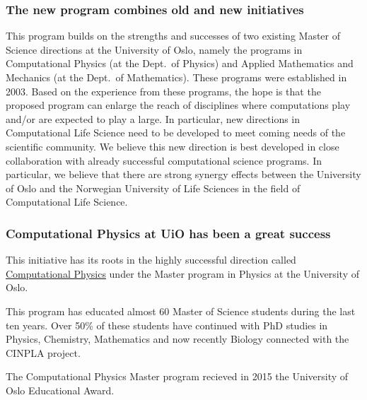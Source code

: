 \documentclass{beamer}
\begin{document}
\begin{frame}
\frametitle{The new program combines old and new initiatives}

\begin{block}{}

This program builds on the strengths and successes of two existing Master of Science directions at the University of Oslo, namely the 
programs in Computational Physics (at the Dept.~of Physics) and
Applied Mathematics and Mechanics (at the Dept.~of Mathematics).
These programs were established in 2003.
Based on the experience from these programs, the hope is that the proposed program can enlarge the reach of disciplines where computations play and/or are expected to play  a large. In particular, new directions 
in Computational Life Science need to  be developed to
meet coming needs of the scientific community. We believe this new direction is
best developed in close collaboration with already successful
computational science programs.  In particular, we believe that there are strong synergy effects between the University of Oslo and the Norwegian 
University of Life Sciences in the field of Computational Life Science.

\end{block}
\end{frame}

\begin{frame}
\frametitle{Computational Physics at UiO has been a great success}

\begin{block}{}

This initiative has its roots in the highly successful direction called \href{{http://www.uio.no/english/studies/programmes/physics-master/programme-options/computational/index.html}}{Computational Physics}
under the Master program in Physics at the University of Oslo.

This program has educated almost 60 Master of Science students during
the last ten years.  Over 50\% of these students have continued with
PhD studies in Physics, Chemistry, Mathematics and now recently
Biology connected with the CINPLA project.

The Computational Physics Master program recieved in 2015 the University of Oslo Educational Award.

\end{block}
\end{frame}
\end{document}
